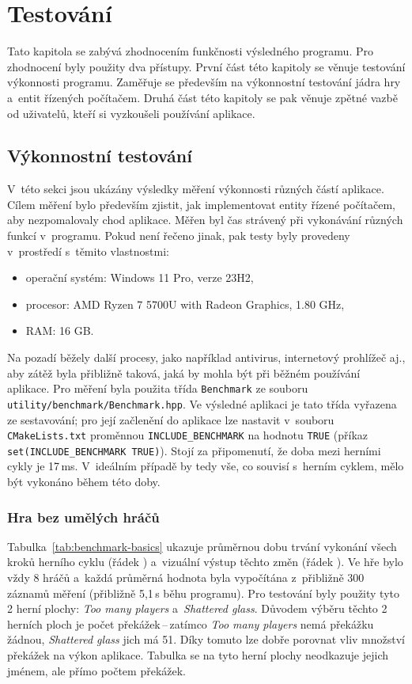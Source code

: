 \chapter{Testování}
\label{ch:testovani}

Tato kapitola se zabývá zhodnocením funkčnosti výsledného programu. Pro zhodnocení byly použity dva přístupy. První část této kapitoly se věnuje testování výkonnosti programu. Zaměřuje se především na výkonnostní testování jádra hry a~entit řízených počítačem. Druhá část této kapitoly se pak věnuje zpětné vazbě od uživatelů, kteří si vyzkoušeli používání aplikace.

\section{Výkonnostní testování}
\label{sec:vykonnostni-testovani}

V~této sekci jsou ukázány výsledky měření výkonnosti různých částí aplikace. Cílem měření bylo především zjistit, jak implementovat entity řízené počítačem, aby nezpomalovaly chod aplikace. Měřen byl čas strávený při vykonávání různých funkcí v~programu. Pokud není řečeno jinak, pak testy byly provedeny v~prostředí s~těmito vlastnostmi:
\begin{itemize}
    \item operační systém: Windows 11 Pro, verze 23H2,
    \item procesor: AMD Ryzen 7 5700U with Radeon Graphics, 1.80 GHz,
    \item RAM: 16 GB.
\end{itemize}
Na pozadí běžely další procesy, jako například antivirus, internetový prohlížeč aj., aby zátěž byla přibližně taková, jaká by mohla být při běžném používání aplikace. Pro měření byla použita třída \texttt{Benchmark} ze souboru \texttt{utility/benchmark/Benchmark.hpp}. Ve výsledné aplikaci je tato třída vyřazena ze sestavování; pro její začlenění do aplikace lze nastavit v~souboru \texttt{CMakeLists.txt} proměnnou \texttt{INCLUDE\_BENCHMARK} na hodnotu \texttt{TRUE} (příkaz \texttt{set(INCLUDE\_BENCHMARK TRUE)}). Stojí za připomenutí, že doba mezi herními cykly je 17\,ms. V~ideálním případě by tedy vše, co souvisí s~herním cyklem, mělo být vykonáno během této doby.

\subsection*{Hra bez umělých hráčů}

Tabulka~\ref{tab:benchmark-basics} ukazuje průměrnou dobu trvání vykonání všech kroků herního cyklu (řádek ) a~vizuální výstup těchto změn (řádek ). Ve hře bylo vždy 8 hráčů a~každá průměrná hodnota byla vypočítána z~přibližně 300 záznamů měření (přibližně 5,1\,s běhu programu). Pro testování byly použity tyto 2 herní plochy: \emph{Too many players} a~\emph{Shattered glass}. Důvodem výběru těchto 2 herních ploch je počet překážek\,--\,zatímco \emph{Too many players} nemá překážku žádnou, \emph{Shattered glass} jich má 51. Díky tomuto lze dobře porovnat vliv množství překážek na výkon aplikace. Tabulka se na tyto herní plochy neodkazuje jejich jménem, ale přímo počtem překážek.

